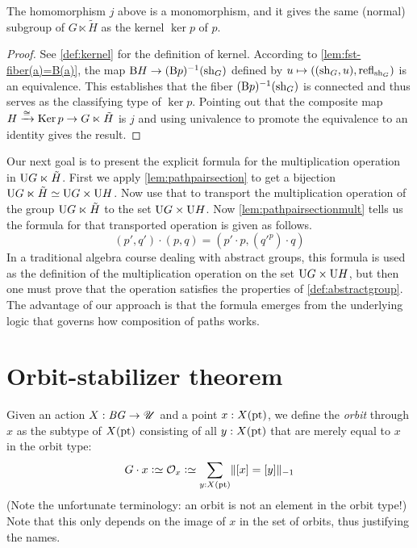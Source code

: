 \begin{lemma}
  The homomorphism $j$ above is a monomorphism, and it gives the same (normal) subgroup of $G \ltimes \tilde H$ as the kernel $\ker p$ of $p$.
\end{lemma}

\begin{proof}
  See \ref{def:kernel} for the definition of kernel.  According to \cref{lem:fst-fiber(a)=B(a)}, the map $\mathrm{B} H \to (\mathrm{B} p)^{-1}(\mathrm{sh}_G)$ defined by
  $ u \mapsto ((\sh_G,u), \refl{\sh_G}) $ is an equivalence.  This establishes that the fiber $(\mathrm{B} p)^{-1}(\mathrm{sh}_G)$ is connected and thus serves as
  the classifying type of $\ker p$.  Pointing out that the composite map $H \xrightarrow{\isom} \ker p \to G \ltimes \tilde H$ is $j$ and using
  univalence to promote the equivalence to an identity gives the result.
\end{proof}

Our next goal is to present the explicit formula for the multiplication operation in $\mathrm{U} { G \ltimes \tilde H }$.
First we apply \cref{lem:pathpairsection} to get a bijection $\mathrm{U} { G \ltimes \tilde H } \simeq \mathrm{U} G \times \mathrm{U} H$.
Now use that to transport the multiplication operation of the group $\mathrm{U} { G \ltimes \tilde H }$ to the set $\mathrm{U} G \times \mathrm{U} H$.
Now \cref{lem:pathpairsectionmult} tells us the formula for that transported operation is given as follows.
$$ (p',q') \cdot (p,q) = (p' \cdot p , ({q'} ^ p) \cdot q) $$
In a traditional algebra course dealing with abstract groups, this formula is used as the definition of the multiplication operation
on the set $\mathrm{U} G \times \mathrm{U} H$, but then one must prove that the operation satisfies the properties of \cref{def:abstractgroup}.
The advantage of our approach is that the formula emerges from the underlying logic that governs how composition of paths works.

\section{Orbit-stabilizer theorem}
\label{sec:orbit-stabilizer-theorem}

Given an action $X : \mathit{B}\mathit{G} \to {\mathscr{U}}$ and a point $x : X(\mathrm{pt})$, we define
the \emph{orbit} through $x$ as the subtype of $X(\mathrm{pt})$ consisting of
all $y : X(\mathrm{pt})$ that are merely equal to $x$ in the orbit type:
\[
  G\cdot x \defeq \mathcal O_x \defeq \sum_{y : X(\pt)} \merely{[x] = [y]}
\]
(Note the unfortunate terminology: an orbit is not an element in the
orbit type!)
Note that this only depends on the image of $x$ in the set of orbits,
thus justifying the names.

